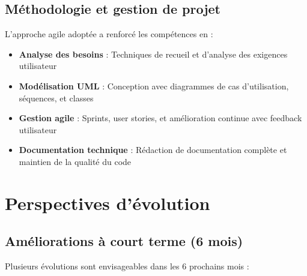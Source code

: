 \documentclass[12pt,a4paper]{report}
\begin{document}
\subsection{Méthodologie et gestion de projet}
L'approche agile adoptée a renforcé les compétences en :

\begin{itemize}
\item \textbf{Analyse des besoins} : Techniques de recueil et d'analyse des exigences utilisateur
\item \textbf{Modélisation UML} : Conception avec diagrammes de cas d'utilisation, séquences, et classes
\item \textbf{Gestion agile} : Sprints, user stories, et amélioration continue avec feedback utilisateur
\item \textbf{Documentation technique} : Rédaction de documentation complète et maintien de la qualité du code
\end{itemize}

\section{Perspectives d'évolution}


\subsection{Améliorations à court terme (6 mois)}
Plusieurs évolutions sont envisageables dans les 6 prochains mois :
\end{document}
